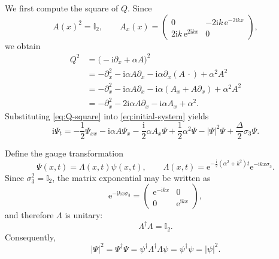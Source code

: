 \documentclass{amsart}
\numberwithin{equation}{hw}
\begin{document}
We first compute the square of $Q$. Since
\begin{equation}
A(x)^2=\mathbb{I}_2,
\qquad
A_x(x)=
\begin{pmatrix}
0 & -2\mathrm{i}k\,{\mathrm e}^{-2\mathrm{i}kx}
\\
2\mathrm{i}k\,{\mathrm e}^{2\mathrm{i}kx} & 0
\end{pmatrix},
\label{eq:A-square}
\end{equation}
we obtain
\begin{align}
Q^2
&=
\bigl(-\mathrm{i}\partial_x+\alpha A\bigr)^2
\nonumber\\
&=
-\partial_x^2
-\mathrm{i}\alpha A\partial_x
-\mathrm{i}\alpha\partial_x(A\,\cdot)
+\alpha^2A^2
\nonumber\\
&=
-\partial_x^2
-\mathrm{i}\alpha A\partial_x
-\mathrm{i}\alpha(A_x+A\partial_x)
+\alpha^2A^2
\nonumber\\
&=
-\partial_x^2
-2\mathrm{i}\alpha A\partial_x
-\mathrm{i}\alpha A_x
+\alpha^2.
\label{eq:Q-square}
\end{align}
Substituting \eqref{eq:Q-square} into \eqref{eq:initial-system} yields
\begin{equation}
\mathrm{i}\Psi_t
=
-\frac{1}{2}\Psi_{xx}
-\mathrm{i}\alpha A\Psi_x
-\frac{\mathrm{i}}{2}\alpha A_x\Psi
+\frac{1}{2}\alpha^2\Psi
-|\Psi|^2\Psi
+\frac{\Delta}{2}\sigma_3\Psi.
\label{eq:expanded-system}
\end{equation}

Define the gauge transformation
\begin{equation}
\Psi(x,t)
=
\Lambda(x,t)\psi(x,t),
\qquad
\Lambda(x,t)
=
{\mathrm e}^{-\frac{\mathrm{i}}{2}(\alpha^2+k^2)t}
{\mathrm e}^{-\mathrm{i}kx\sigma_3}.
\label{eq:first-gauge}
\end{equation}
Since $\sigma_3^2=\mathbb{I}_2$, the matrix exponential may be written as
\begin{equation}
{\mathrm e}^{-\mathrm{i}kx\sigma_3}
=
\begin{pmatrix}
{\mathrm e}^{-\mathrm{i}kx} & 0
\\
0 & {\mathrm e}^{\mathrm{i}kx}
\end{pmatrix},
\end{equation}
and therefore $\Lambda$ is unitary:
\begin{equation}
\Lambda^\dagger\Lambda=\mathbb{I}_2.
\label{eq:Lambda-unitary}
\end{equation}
Consequently,
\begin{equation}
|\Psi|^2
=
\Psi^\dagger\Psi
=
\psi^\dagger\Lambda^\dagger\Lambda\psi
=
\psi^\dagger\psi
=
|\psi|^2.
\label{eq:norm-invariant}
\end{equation}
\end{document}
